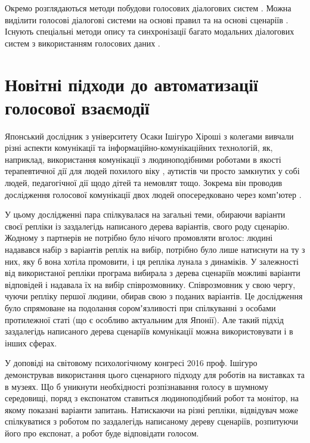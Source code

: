 Окремо розглядаються методи побудови голосових діалогових систем \cite{Iosif_2018}. Можна виділити голосові діалогові системи на основі правил \cite{Herbert_2018,Lopes_2015} та на основі сценаріїв \cite{Lopez_2016,Khouzaimi_2018}. Існують спеціальні методи опису та синхронізації багато модальних діалогових систем з використанням голосових даних \cite{Katsurada_2003,Karpov_2012}. 

\section{Новітні підходи до автоматизації голосової взаємодії} \label{sect1_5}

Японський дослідник з університету Осаки Ішігуро Хіроші з колегами вивчали різні аспекти комунікації та інформаційно-комунікаційних технологій, як, наприклад, використання комунікації з людиноподібними роботами в якості терапевтичної дії для людей похилого віку \cite{Nishio_2015}, аутистів \cite{Kumazaki_2016} чи просто замкнутих у собі людей, педагогічної дії щодо дітей та немовлят \cite{Park_2015} тощо. Зокрема він проводив дослідження голосової комунікації двох людей опосередковано через компʼютер \cite{Ishiguro_2016}. 

У цьому дослідженні пара спілкувалася на загальні теми, обираючи варіанти своєї репліки із заздалегідь написаного дерева варіантів, свого роду сценарію. Жодному з партнерів не потрібно було нічого промовляти вголос: людині надавався набір з варіантів реплік на вибір, потрібно було лише натиснути на ту з них, яку б вона хотіла  промовити, і ця репліка лунала з динаміків. У залежності від використаної репліки програма вибирала з дерева сценаріїв можливі варіанти відповідей і надавала їх на вибір співрозмовнику. Співрозмовник у свою чергу, чуючи репліку першої людини, обирав свою з поданих варіантів. Це дослідження було спрямоване на подолання соромʼязливості при спілкуванні з особами протилежної статі (що є особливо актуальним для Японії). Але такий підхід заздалегідь написаного дерева сценаріїв комунікації можна використовувати і в інших сферах.

У доповіді на світовому психологічному конгресі 2016 проф. Ішігуро демонстрував використання цього сценарного підходу для роботів на виставках та в музеях. Що б уникнути необхідності розпізнавання голосу в шумному середовищі, поряд з експонатом ставиться людиноподібний робот та монітор, на якому показані варіанти запитань. Натискаючи на різні репліки, відвідувач може спілкуватися з роботом по заздалегідь написаному дереву сценаріїв, розпитуючи його про експонат, а робот буде відповідати голосом.

